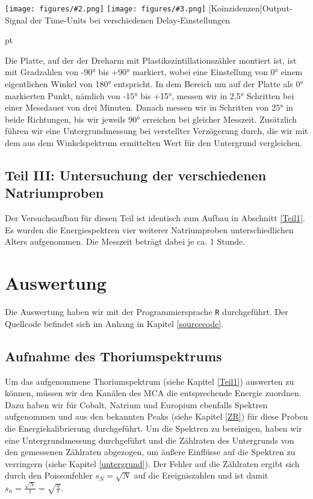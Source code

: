 \documentclass[12pt,listof=totoc]{scrartcl}
\newcommand{\graTwoShort}[5][0.49]{
	\begin{minipage}[h!]{\textwidth}
		\centering
		\texttt{[image: figures/\#2.png]}
		\texttt{[image: figures/\#3.png]}
		\captionof{figure}[#4]{#5}
	\end{minipage}
	\vskip 30 pt
}
\newcommand{\code}[1]{\texttt{#1}}
\begin{document}
\graTwoShort[0.5]{Koinzidenzen-1}{Koinzidenzen-2}{Koinzidenzen}{Output-Signal der Time-Units bei verschiedenen Delay-Einstellungen \label{Koinzidenzen}}

Die Platte, auf der der Dreharm mit Plastikszintillationszähler montiert ist, ist mit Gradzahlen von -90° bis +90° markiert, wobei eine Einstellung von 0° einem eigentlichen Winkel von 180° entspricht. In dem Bereich um auf der Platte als 0° markierten Punkt, nämlich von -15° bis +15°, messen wir in 2,5° Schritten bei einer Messdauer von drei Minuten. Danach messen wir in Schritten von 25° in beide Richtungen, bis wir jeweils 90° erreichen bei gleicher Messzeit.
Zusätzlich führen wir eine Untergrundmessung bei verstellter Verzögerung durch, die wir mit dem aus dem Winkelspektrum ermittelten Wert für den Untergrund vergleichen.

\subsection{Teil III: Untersuchung der verschiedenen Natriumproben}

Der Versuchsaufbau für diesen Teil ist identisch zum Aufbau in Abschnitt \ref{Teil1}.
Es wurden die Energiespektren vier weiterer Natriumproben unterschiedlichen Alters aufgenommen. Die Messzeit beträgt dabei je ca. 1 Stunde.


\newpage
\section{Auswertung}Die Auswertung haben wir mit der Programmiersprache \code{R} durchgeführt. Der Quellcode befindet sich im Anhang in Kapitel \ref{sourcecode}.
\subsection{Aufnahme des Thoriumspektrums}\label{thoriumspektrum}
Um das aufgenommene Thoriumspektrum (siehe Kapitel \ref{Teil1}) auswerten zu können, müssen wir den Kanälen des MCA die entsprechende Energie zuordnen. Dazu haben wir für Cobalt, Natrium und Europium ebenfalls Spektren aufgenommen und aus den bekannten Peaks (siehe Kapitel \ref{ZR}) für diese Proben die Energiekalibrierung durchgeführt. Um die Spektren zu bereinigen, haben wir eine Untergrundmessung durchgeführt und die Zählraten des Untergrunds von den gemessenen Zählraten abgezogen, um äußere Einflüsse auf die Spektren zu verringern (siehe Kapitel \ref{untergrund}). Der Fehler auf die Zählraten ergibt sich durch den Poissonfehler $s_N=\sqrt{N}$ auf die Ereigniszahlen und ist damit $s_n=\frac{\sqrt{N}}{t}=\sqrt{\frac{n}{t}}$.\\
\end{document}
